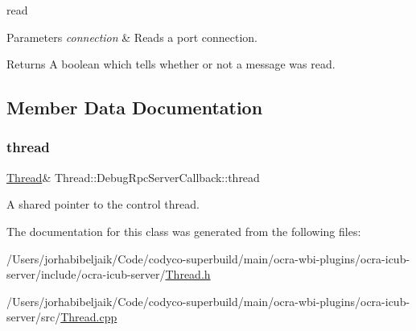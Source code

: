 read 
\begin{DoxyParams}{Parameters}
{\em connection} & Reads a port connection.\\
\hline
\end{DoxyParams}
\begin{DoxyReturn}{Returns}
A boolean which tells whether or not a message was read. 
\end{DoxyReturn}


\subsection{Member Data Documentation}
\hypertarget{classThread_1_1DebugRpcServerCallback_ad75683fc200019e8f681ad441b6ce84b}{}\label{classThread_1_1DebugRpcServerCallback_ad75683fc200019e8f681ad441b6ce84b} 
\subsubsection{\texorpdfstring{thread}{thread}}
{\footnotesize\ttfamily \hyperlink{classThread}{Thread}\& Thread\+::\+Debug\+Rpc\+Server\+Callback\+::thread\hspace{0.3cm}{\ttfamily [private]}}

A shared pointer to the control thread. 

The documentation for this class was generated from the following files\+:\begin{DoxyCompactItemize}
\item 
/\+Users/jorhabibeljaik/\+Code/codyco-\/superbuild/main/ocra-\/wbi-\/plugins/ocra-\/icub-\/server/include/ocra-\/icub-\/server/\hyperlink{Thread_8h}{Thread.\+h}\item 
/\+Users/jorhabibeljaik/\+Code/codyco-\/superbuild/main/ocra-\/wbi-\/plugins/ocra-\/icub-\/server/src/\hyperlink{Thread_8cpp}{Thread.\+cpp}\end{DoxyCompactItemize}
